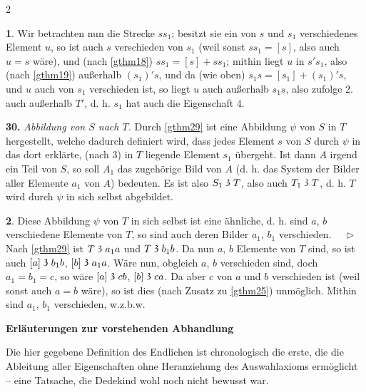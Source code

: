 \documentclass[leqno,hidelinks,10pt]{article}
\theoremstyle{definition}
\newtheorem{satz}{\protect\satzname}
\newcommand{\satzname}{}
\renewcommand{\satzname}{\hspace{-4pt}.\ Satz}%
\renewcommand{\satzname}{\hspace{-4pt}.\ Theorem}%
\newcommand\Beweis{\medskip \newline $ \phantom{'.'} \rhd \ $}%
\newcommand\TeilVon{\mathrel{\raisebox{0.45ex}{$\mathfrak{3}$}}}
\newcommand{\sref}[1]{\underline{\ref{#1}}}%
\begin{document}
\begin{paracol}{2}
\begin{leftcolumn}
\begin{satz}
Wir betrachten nun die Strecke $ss_1$; besitzt sie ein von $s$ und $s_1$
verschiedenes Element $u$, so ist auch $s$ verschieden von $s_1$ (weil sonst
$ss_1 = [s]$, also auch $u = s$ wäre), und (nach \sref{gthm18}) $ss_1 = [s] + ss_1$;
mithin liegt $u$ in $s's_1$, also (nach \sref{gthm19}) außerhalb $(s_1)'s$, und
da (wie oben) $s_1s = [s_1] + (s_1)'s$, und $u$ auch von $s_1$ verschieden ist, so
liegt $u$ auch außerhalb  $s_1s$, also zufolge 2. auch außerhalb $T'$, d. h. $s_1$
hat auch die Eigenschaft 4.
\end{satz}

\noindent \textbf{30.}\label{gthm30} \emph{Abbildung von $S$ nach $T$.}
Durch \sref{gthm29} ist eine Abbildung $\psi$ von $S$ in $T$ hergestellt, welche
dadurch definiert wird, dass jedes Element $s$ von $S$ durch $\psi$ in das dort
erklärte, (nach 3) in $T$ liegende Element $s_1$ übergeht. Ist dann
$A$ irgend ein Teil von $S$, so soll $A_1$ das zugehörige Bild von $A$ (d. h.
das System der Bilder aller Elemente $a_1$ von $A$) bedeuten. Es ist also
$S_1 \TeilVon T$, also auch $T_1 \TeilVon T$, d. h. $T$ wird durch $\psi$ in sich
selbst abgebildet.

\begin{satz}\label{gthm31}
Diese Abbildung $\psi$ von $T$ in sich selbst ist eine ähnliche, d. h. sind $a$, $b$
verschiedene Elemente von $T$, so sind auch deren Bilder $a_1$, $b_1$ verschieden.
\Beweis
Nach \sref{gthm29} ist $T \TeilVon a_1a$ und $T \TeilVon b_1b$. Da nun $a$, $b$
Elemente von $T$ sind, so ist auch $[a] \TeilVon b_1b$, $[b] \TeilVon a_1a$. Wäre
nun, obgleich $a$, $b$ verschieden sind, doch $a_1 = b_1 = c$, so wäre
$[a] \TeilVon cb$, $[b] \TeilVon ca$. Da aber $c$ von $a$ und $b$ verschieden
ist (weil sonst auch $a = b$ wäre), so ist dies (nach Zusatz zu \sref{gthm25})
unmöglich. Mithin sind $a_1$, $b_1$ verschieden, w.z.b.w.
\end{satz}

\newpage

\hspace{64pt}

\begin{center}\Large\textbf{Erläuterungen zur vorstehenden Abhandlung}
\end{center}\par

\bigskip
\justifying
\fontsize{9}{9}\selectfont
Die hier gegebene Definition des Endlichen ist chronologisch die erste, die die
Ableitung aller Eigenschaften ohne Heranziehung des Auswahlaxioms ermöglicht --
eine Tatsache, die Dedekind wohl noch nicht bewusst war.


\end{leftcolumn}
\end{paracol}
\end{document}
